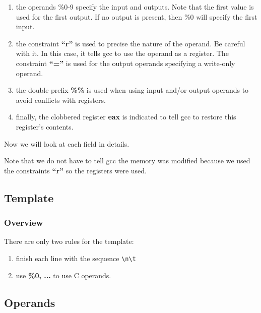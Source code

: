 {\begin{frame}
  \begin{enumerate}[<+->]
    \item
      the operands \%0-9 specify the input and outputs. Note that the first
      value is used for the first output. If no output is present, then
      \%0 will specify the first input.
    \item
      the constraint \textbf{``r''} is used to precise the nature of
      the operand. Be careful with it. In this case, it tells gcc to use
      the operand as a register. The constraint \textbf{``=''} is used for
      the output operands specifying a write-only operand.
    \item
      the double prefix \textbf{\%\%} is used when using input and/or
      output operands to avoid conflicts with registers.
    \item
      finally, the clobbered register \textbf{eax} is indicated to tell
      gcc to restore this register's contents.
  \end{enumerate}

  Now we will look at each field in details.

  \nl

  Note that we do not have to tell gcc the memory was modified because
  we used the constraints \textbf{``r''} so the registers were used.
\end{frame}

%
%

\subsection{Template}


\begin{frame}[containsverbatim]
  \frametitle{Overview}

  There are only two rules for the template:

  \begin{enumerate}[<+->]
    \item
      finish each line with the sequence \verb|\n\t|
    \item
      use \textbf{\%0, ...} to use C operands.
  \end{enumerate}
\end{frame}

%
%

\subsection{Operands}

}
